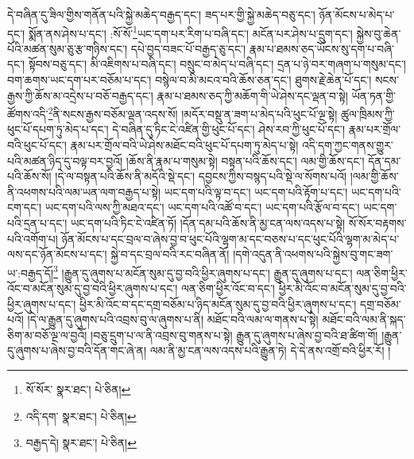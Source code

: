 དེ་བཞིན་དུ་ཟིལ་གྱིས་གནོན་པའི་སྐྱེ་མཆེད་བརྒྱད་དང་། ཟད་པར་གྱི་སྐྱེ་མཆེད་བཅུ་དང་། ཉོན་མོངས་པ་མེད་པ་དང་། སྨོན་ནས་ཤེས་པ་དང་། :སོ་སོ་\footnote{སོ་སོར་  སྣར་ཐང་།  པེ་ཅིན། }ཡང་དག་པར་རིག་པ་བཞི་དང་། མངོན་པར་ཤེས་པ་དྲུག་དང་། སྐྱེས་བུ་ཆེན་པོའི་མཚན་སུམ་ཅུ་རྩ་གཉིས་དང་། དཔེ་བྱད་བཟང་པོ་བརྒྱད་ཅུ་དང་། རྣམ་པ་ཐམས་ཅད་ཡོངས་སུ་དག་པ་བཞི་དང་། སྟོབས་བཅུ་དང་། མི་འཇིགས་པ་བཞི་དང་། བསྲུང་བ་མེད་པ་བཞི་དང་། དྲན་པ་ཉེ་བར་གཞག་པ་གསུམ་དང་། བག་ཆགས་ཡང་དག་པར་བཅོམ་པ་དང་། བསྙེལ་བ་མི་མངའ་བའི་ཆོས་ཅན་དང་། ཐུགས་རྗེ་ཆེན་པོ་དང་། སངས་རྒྱས་ཀྱི་ཆོས་མ་འདྲེས་པ་བཅོ་བརྒྱད་དང་། རྣམ་པ་ཐམས་ཅད་ཀྱི་མཆོག་གི་ཡེ་ཤེས་དང་ལྡན་བ་སྟེ། ཡོན་ཏན་གྱི་ཚོགས་འདི་\footnote{འདི་དག་  སྣར་ཐང་།  པེ་ཅིན། }ནི་སངས་རྒྱས་བཅོམ་ལྡན་འདས་སོ། །མདོར་བསྡུ་ན་ཟག་པ་མེད་པའི་ཕུང་པོ་ལྔ་སྟེ། ཚུལ་ཁྲིམས་ཀྱི་ཕུང་པོ་དཔག་ཏུ་མེད་པ་དང་། དེ་བཞིན་དུ་ཏིང་ངེ་འཛིན་གྱི་ཕུང་པོ་དང་། ཤེས་རབ་ཀྱི་ཕུང་པོ་དང་། རྣམ་པར་གྲོལ་བའི་ཕུང་པོ་དང་། རྣམ་པར་གྲོལ་བའི་ཡེ་ཤེས་མཐོང་བའི་ཕུང་པོ་དཔག་ཏུ་མེད་པ་སྟེ། འདི་དག་ཀྱང་གནས་གྱུར་པའི་མཚན་ཉིད་དུ་བལྟ་བར་བྱའོ། །ཆོས་ནི་རྣམ་པ་གསུམ་སྟེ། བསྟན་པའི་ཆོས་དང་། ལམ་གྱི་ཆོས་དང་། དོན་དམ་པའི་ཆོས་སོ། །དེ་ལ་བསྟན་པའི་ཆོས་ནི་མདོའི་སྡེ་དང་། དབྱངས་ཀྱིས་བསྙད་པའི་སྡེ་ལ་སོགས་པའོ། །ལམ་གྱི་ཆོས་ནི་འཕགས་པའི་ལམ་ཡན་ལག་བརྒྱད་པ་སྟེ། ཡང་དག་པའི་ལྟ་བ་དང་། ཡང་དག་པའི་རྟོག་པ་དང་། ཡང་དག་པའི་ངག་དང་། ཡང་དག་པའི་ལས་ཀྱི་མཐའ་དང་། ཡང་དག་པའི་འཚོ་བ་དང་། ཡང་དག་པའི་རྩོལ་བ་དང་། ཡང་དག་པའི་དྲན་པ་དང་། ཡང་དག་པའི་ཏིང་ངེ་འཛིན་ཏོ། །དོན་དམ་པའི་ཆོས་ནི་མྱ་ངན་ལས་འདས་པ་སྟེ། སོ་སོར་བརྟགས་པའི་འགོག་པ། ཉོན་མོངས་པ་དང་བྲལ་བ་ཞེས་བྱ་བ་ཕུང་པོའི་ལྷག་མ་དང་བཅས་པ་དང་ཕུང་པོའི་ལྷག་མ་མེད་པ་ལས་དང་ཉོན་མོངས་པ་དང་། སྐྱེ་བ་དང་བྲལ་བའི་རང་བཞིན་ནོ། །དགེ་འདུན་ནི་འཕགས་པའི་སྐྱེས་བུ་གང་ཟག་ཡ་:བརྒྱད་དོ།\footnote{བརྒྱད་དེ།  སྣར་ཐང་།  པེ་ཅིན། } །རྒྱུན་དུ་ཞུགས་པ་མངོན་སུམ་དུ་བྱ་བའི་ཕྱིར་ཞུགས་པ་དང་། རྒྱུན་དུ་ཞུགས་པ་དང་། ལན་ཅིག་ཕྱིར་འོང་བ་མངོན་སུམ་དུ་བྱ་བའི་ཕྱིར་ཞུགས་པ་དང་། ལན་ཅིག་ཕྱིར་འོང་བ་དང་། ཕྱིར་མི་འོང་བ་མངོན་སུམ་དུ་བྱ་བའི་ཕྱིར་ཞུགས་པ་དང་། ཕྱིར་མི་འོང་བ་དང་དགྲ་བཅོམ་པ་ཉིད་མངོན་སུམ་དུ་བྱ་བའི་ཕྱིར་ཞུགས་པ་དང་། དགྲ་བཅོམ་པའོ། །དེ་ལ་རྒྱུན་དུ་ཞུགས་པའི་འབྲས་བུ་ལ་ཞུགས་པ་ནི། མཐོང་བའི་ལམ་ལ་གནས་པ་སྟེ། མཐོང་བའི་ལམ་ནི་སྐད་ཅིག་མ་བཅོ་ལྔ་ལ་བྱའོ། །བཅུ་དྲུག་པ་ལ་ནི་འབྲས་བུ་གནས་པ་སྟེ། རྒྱུན་དུ་ཞུགས་པ་ཞེས་བྱ་བའི་ཐ་ཚིག་གོ། །རྒྱུན་དུ་ཞུགས་པ་ཞེས་བྱ་བའི་དོན་གང་ཞེ་ན། ལམ་ནི་མྱ་ངན་ལས་འདས་པའི་རྒྱུན་ཏེ། དེ་དེ་ནས་འགྲོ་བའི་ཕྱིར་རོ། །
